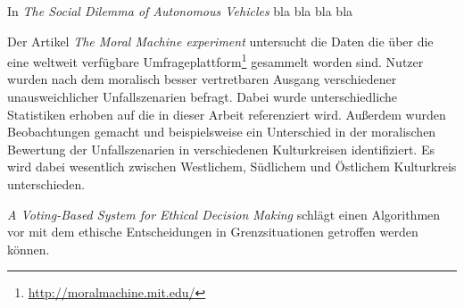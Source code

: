 In \textit{The Social Dilemma of Autonomous Vehicles} \cite{socialDilemma} bla bla bla bla



Der Artikel \textit{The Moral Machine experiment} \cite{moralMachine} untersucht die Daten die über die eine weltweit verfügbare Umfrageplattform\footnote{\url{http://moralmachine.mit.edu/}} gesammelt worden sind. Nutzer wurden nach dem moralisch besser vertretbaren Ausgang verschiedener unausweichlicher Unfallszenarien befragt. Dabei wurde unterschiedliche Statistiken erhoben auf die in dieser Arbeit referenziert wird. Außerdem wurden Beobachtungen gemacht und beispielsweise ein Unterschied in der moralischen Bewertung der Unfallszenarien in verschiedenen Kulturkreisen identifiziert. Es wird dabei wesentlich zwischen Westlichem, Südlichem und Östlichem Kulturkreis unterschieden.


\textit{A Voting-Based System for Ethical Decision Making} \cite{votingBasedSystem} schlägt einen Algorithmen vor mit dem ethische Entscheidungen in Grenzsituationen getroffen werden können.